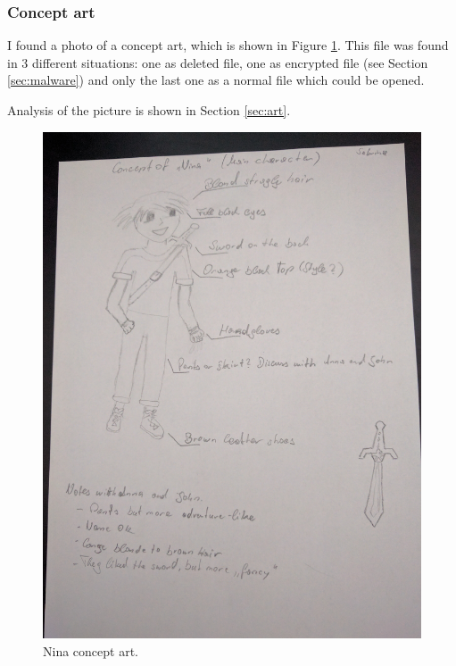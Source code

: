 \documentclass[12pt]{article}
\begin{document}
\subsubsection{Concept art}

I found a photo of a concept art, which is shown in Figure \ref{fig:nina}.
This file was found in 3 different situations: one as deleted file, one as encrypted file (see Section \ref{sec:malware}) and only the last one as a normal file which could be opened.

Analysis of the picture is shown in Section \ref{sec:art}.

\begin{figure}[!ht]
    \centering
    \includegraphics[width=\textwidth]{images/nina_concept.jpg}
    \caption{Nina concept art.}
    \label{fig:nina}
\end{figure}
\end{document}
